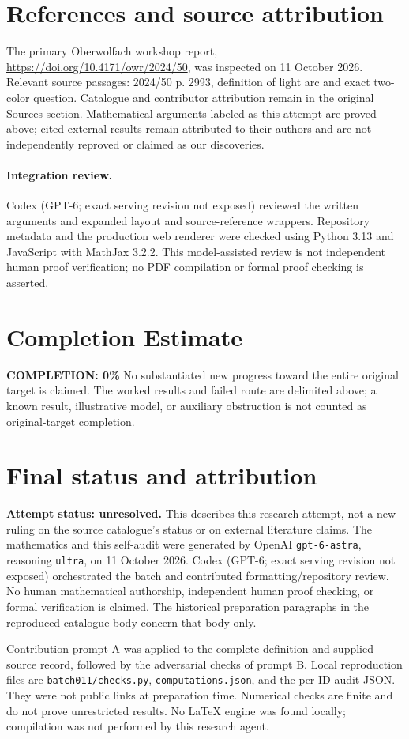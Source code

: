 \documentclass[11pt]{article}
\begin{document}
\section{References and source attribution}
The primary Oberwolfach workshop report, \url{https://doi.org/10.4171/owr/2024/50}, was inspected on 11 October 2026. Relevant source passages: 2024/50 p. 2993, definition of light arc and exact two-color question. Catalogue and contributor attribution remain in the original Sources section. Mathematical arguments labeled as this attempt are proved above; cited external results remain attributed to their authors and are not independently reproved or claimed as our discoveries.


\paragraph{Integration review.} Codex (GPT-6; exact serving revision not exposed) reviewed the written arguments and expanded layout and source-reference wrappers. Repository metadata and the production web renderer were checked using Python 3.13 and JavaScript with MathJax 3.2.2. This model-assisted review is not independent human proof verification; no PDF compilation or formal proof checking is asserted.

\section{Completion Estimate}
\noindent\textbf{COMPLETION: 0\%}
No substantiated new progress toward the entire original target is claimed. The worked results and failed route are delimited above; a known result, illustrative model, or auxiliary obstruction is not counted as original-target completion.

\section{Final status and attribution}
\textbf{Attempt status: unresolved.} This describes this research attempt, not a new ruling on the source catalogue's status or on external literature claims.
The mathematics and this self-audit were generated by OpenAI \texttt{gpt-6-astra}, reasoning \texttt{ultra}, on 11 October 2026. Codex (GPT-6; exact serving revision not exposed) orchestrated the batch and contributed formatting/repository review. No human mathematical authorship, independent human proof checking, or formal verification is claimed. The historical preparation paragraphs in the reproduced catalogue body concern that body only.

Contribution prompt A was applied to the complete definition and supplied source record, followed by the adversarial checks of prompt B. Local reproduction files are \texttt{batch011/checks.py}, \texttt{computations.json}, and the per-ID audit JSON. They were not public links at preparation time. Numerical checks are finite and do not prove unrestricted results. No LaTeX engine was found locally; compilation was not performed by this research agent.
\end{document}

